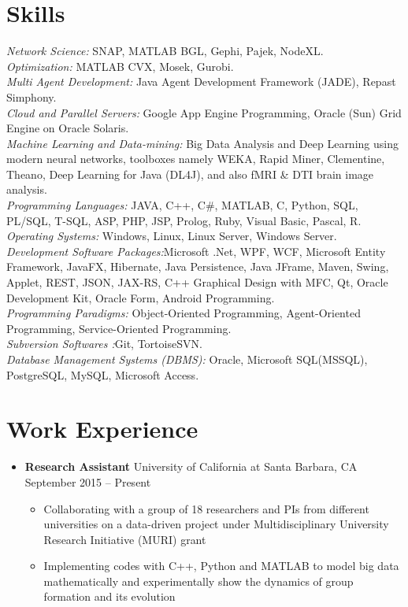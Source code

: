 \documentclass[letter]{res}
\begin{document}
\begin{resume}
		\section{Skills}
		{\sl Network Science: }SNAP, MATLAB BGL, Gephi, Pajek, NodeXL.\\
		{\sl Optimization: }MATLAB CVX, Mosek, Gurobi.\\
		{\sl Multi Agent Development: }Java Agent Development Framework (JADE), Repast Simphony.\\
		{\sl Cloud and Parallel Servers: }Google App Engine Programming, Oracle (Sun) Grid Engine on Oracle Solaris.\\
		{\sl Machine Learning and Data-mining: }Big Data Analysis and Deep Learning using modern neural networks, toolboxes namely WEKA, Rapid Miner, Clementine, Theano, Deep Learning for Java (DL4J), and also fMRI \& DTI brain image analysis.\\
		\textit{Programming Languages: }JAVA, C++, C\#, MATLAB, C, Python, SQL, PL/SQL, T-SQL, ASP, PHP, JSP, Prolog, Ruby, Visual Basic, Pascal, R.\\
		\textit{Operating Systems: } Windows, Linux, Linux Server, Windows Server.\\
		\textit{Development Software Packages:}Microsoft .Net, WPF, WCF, Microsoft Entity Framework, JavaFX, Hibernate, Java Persistence, Java JFrame, Maven, Swing, Applet, REST, JSON, JAX-RS, C++ Graphical Design with MFC, Qt, Oracle Development Kit, Oracle Form, Android Programming.\\
		\textit{Programming Paradigms: }Object-Oriented Programming, Agent-Oriented Programming, Service-Oriented Programming.\\
		\textit{Subversion Softwares :}Git, TortoiseSVN.\\
		\textit{Database Management Systems (DBMS): }Oracle, Microsoft SQL(MSSQL), PostgreSQL, MySQL, Microsoft Access.
		
		\section{Work Experience}
		\begin{itemize}[leftmargin=-.1in]
			\item \textbf{Research Assistant} \newline
			University of California at Santa Barbara, CA \hfill September 2015 – Present\\
			\vspace{-4mm}
			\iflong
			\begin{itemize}
				\item Collaborating with a group of 18 researchers and PIs from different universities on a data-driven project under Multidisciplinary University Research Initiative (MURI) grant
				\item Implementing codes with C++, Python and MATLAB to model big data mathematically and experimentally show the dynamics of group formation and its evolution
			\end{itemize}
			\fi
			

\end{itemize}
\end{resume}
\end{document}
